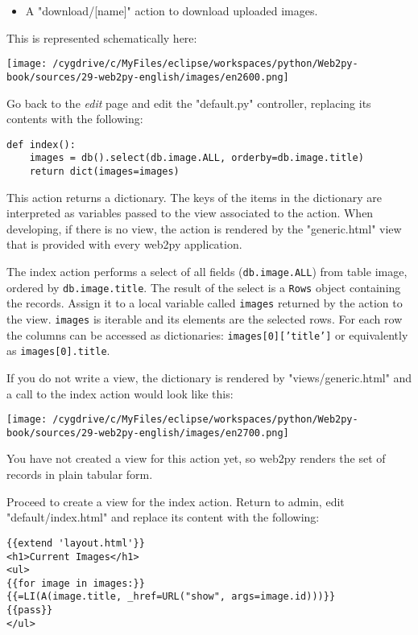\documentclass[justified,sixbynine,notoc]{tufte-book}
\def\ft{\small\tt}
\def\inxx#1{\index{#1}}
\begin{document}
\begin{fullwidth}
\begin{itemize}
\item A "download/[name]" action to download uploaded images.
\end{itemize}

This is represented schematically here:


\goodbreak\begin{center}\texttt{[image: /cygdrive/c/MyFiles/eclipse/workspaces/python/Web2py-book/sources/29-web2py-english/images/en2600.png]}\end{center}


Go back to the {\it edit} page and edit the "default.py" controller, replacing its contents with the following:

\inxx{select}
\begin{lstlisting}
def index():
    images = db().select(db.image.ALL, orderby=db.image.title)
    return dict(images=images)
\end{lstlisting}

This action returns a dictionary. The keys of the items in the dictionary are interpreted as variables passed to the view associated to the action. When developing, if there is no view, the action is rendered by the "generic.html" view that is provided with every web2py application.

The index action performs a select of all fields ({\ft db.image.ALL}) from table image, ordered by {\ft db.image.title}. The result of the select is a {\ft Rows} object containing the records. Assign it to a local variable called {\ft images} returned by the action to the view. {\ft images} is iterable and its elements are the selected rows. For each row the columns can be accessed as dictionaries:
{\ft images[0]['title']} or equivalently as {\ft images[0].title}.

If you do not write a view, the dictionary is rendered by "views/generic.html" and a call to the index action would look like this:


\goodbreak\begin{center}\texttt{[image: /cygdrive/c/MyFiles/eclipse/workspaces/python/Web2py-book/sources/29-web2py-english/images/en2700.png]}\end{center}


You have not created a view for this action yet, so web2py renders the set of records in plain tabular form.

Proceed to create a view for the index action. Return to admin, edit "default/index.html" and replace its content with the following:
\begin{lstlisting}[keywords={}]
{{extend 'layout.html'}}
<h1>Current Images</h1>
<ul>
{{for image in images:}}
{{=LI(A(image.title, _href=URL("show", args=image.id)))}}
{{pass}}
</ul>
\end{lstlisting}


\end{fullwidth}
\end{document}
